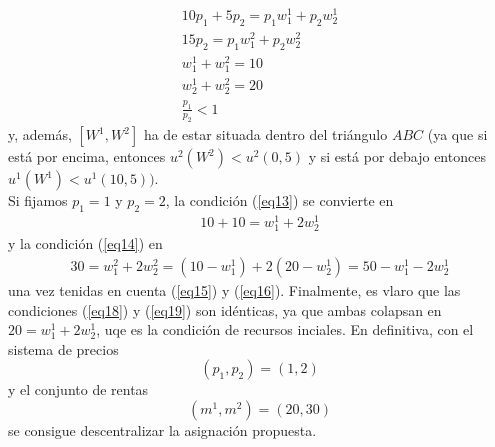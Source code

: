 \begin{enumerate}[a)]
			\begin{gather}
				10p_1 + 5p_2 = p_1w_{1}^{1} + p_2w_{2}^{1} \label{eq13}\\
				15p_2 = p_1w_{1}^{2}+p_2w_{2}^{2} \label{eq14} \\
				w_{1}^{1} + w_{1}^{2} = 10 \label{eq15} \\
				w_{2}^{1} + w_{2}^{2} = 20 \label{eq16} \\
				\frac{p_1}{p_2} < 1 \label{eq17}
			\end{gather}
		y, además, $\left[W^1, W^2 \right]$ ha de estar situada dentro del triángulo $ABC$ (ya que si está por encima, entonces $u^2(W^2) < u^2(0,5)$ y si está por debajo entonces $u^1(W^1) < u^1(10,5))$.\\
		
		Si fijamos $p_1 = 1$ y $p_2 = 2$, la condición (\ref{eq13}) se convierte en
			\begin{gather}
				10 + 10 = w_{1}^{1} + 2w_{2}^{1} \label{eq18}
			\end{gather}
		y la condición (\ref{eq14}) en
			\begin{gather}
				30 = w_{1}^{2} + 2w_{2}^{2} = (10 - w_{1}^{1}) + 2(20 - w_{2}^{1}) = 50 -w_{1}^{1} - 2w_{2}^{1} \label{eq19}
			\end{gather}
		una vez tenidas en cuenta (\ref{eq15}) y (\ref{eq16}). Finalmente, es vlaro que las condiciones (\ref{eq18}) y (\ref{eq19}) son idénticas, ya que ambas colapsan en $20 = w_{1}^{1} + 2w_{2}^{1}$, uqe es la condición de recursos inciales. En definitiva, con el sistema de precios
			$$(p_1,p_2) = (1,2)$$
		y el conjunto de rentas
			$$(m^1, m^2) = (20,30)$$
		se consigue descentralizar la asignación propuesta.
\end{enumerate}